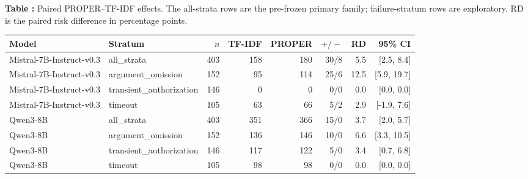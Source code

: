 \begin{center}
\label{tab:primary-effects}
\textbf{Table \thetable:} Paired PROPER--TF-IDF effects. The all-strata rows are the pre-frozen primary family; failure-stratum rows are exploratory. RD is the paired risk difference in percentage points.\par\smallskip
\small
\begin{tabular}{llrrrrrr}
\toprule
Model & Stratum & $n$ & TF-IDF & PROPER & $+/-$ & RD & 95\% CI \\
\midrule
Mistral-7B-Instruct-v0.3 & all\_strata & 403 & 158 & 180 & 30/8 & 5.5 & [2.5, 8.4] \\
Mistral-7B-Instruct-v0.3 & argument\_omission & 152 & 95 & 114 & 25/6 & 12.5 & [5.9, 19.7] \\
Mistral-7B-Instruct-v0.3 & transient\_authorization & 146 & 0 & 0 & 0/0 & 0.0 & [0.0, 0.0] \\
Mistral-7B-Instruct-v0.3 & timeout & 105 & 63 & 66 & 5/2 & 2.9 & [-1.9, 7.6] \\
Qwen3-8B & all\_strata & 403 & 351 & 366 & 15/0 & 3.7 & [2.0, 5.7] \\
Qwen3-8B & argument\_omission & 152 & 136 & 146 & 10/0 & 6.6 & [3.3, 10.5] \\
Qwen3-8B & transient\_authorization & 146 & 117 & 122 & 5/0 & 3.4 & [0.7, 6.8] \\
Qwen3-8B & timeout & 105 & 98 & 98 & 0/0 & 0.0 & [0.0, 0.0] \\
\bottomrule
\end{tabular}
\end{center}
